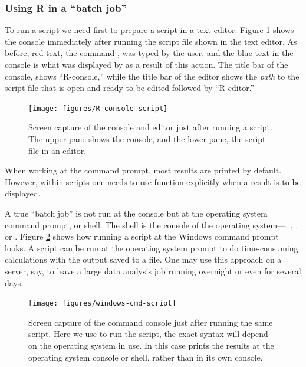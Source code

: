 \documentclass[krantz2]{krantz}\usepackage{knitr}
\begin{document}
\subsubsection{Using R in a ``batch job''}

To run a script we need first to prepare a script in a text editor. Figure \ref{fig:intro:script} shows the console immediately after running the script file shown in the text editor. As before, red text, the command , was typed by the user, and the blue text in the console is what was displayed by \Rpgrm as a result of this action. The title bar of the console, shows ``R-console,'' while the title bar of the editor shows the \emph{path} to the script file that is open and ready to be edited followed by ``R-editor.''

\begin{figure}
  \centering
  \texttt{[image: figures/R-console-script]}
  \caption[Script sourced at the R console]{Screen capture of the \Rpgrm console and editor just after running a script. The upper pane shows the \Rpgrm console, and the lower pane, the script file in an editor. }\label{fig:intro:script}
\end{figure}

\begin{warningbox}
When working at the command prompt, most results are printed by default. However, within scripts one needs to use function  explicitly when a result is to be displayed.
\end{warningbox}

A true ``batch job'' is not run at the \Rpgrm console but at the operating system command prompt, or shell. The shell is the console of the operating system---, , , or . Figure \ref{fig:intro:shell} shows how running a script at the Windows command prompt looks. A script can be run at the operating system prompt to do time-consuming calculations with the output saved to a file. One may use this approach on a server, say, to leave a large data analysis job running overnight or even for several days.

\begin{figure}
  \centering
  \texttt{[image: figures/windows-cmd-script]}
  \caption[Script at the Windows cmd promt]{Screen capture of the  command console just after running the same script. Here we use  to run the script, the exact syntax will depend on the operating system in use. In this case \Rpgrm prints the results at the operating system console or shell, rather than in its own \Rpgrm console.}\label{fig:intro:shell}
\end{figure}
\end{document}
